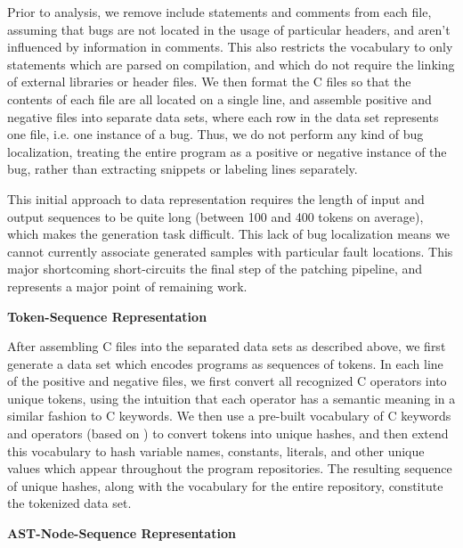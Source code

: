 \documentclass[sigconf]{acmart}
\begin{document}
Prior to analysis, we remove include statements and comments from each file, assuming that bugs are not located in the usage of particular headers, and aren't influenced by information in comments. This also restricts the vocabulary to only statements which are parsed on compilation, and which do not require the linking of external libraries or header files. We then format the C files so that the contents of each file are all located on a single line, and assemble positive and negative files into separate data sets, where each row in the data set represents one file, i.e. one instance of a bug. Thus, we do not perform any kind of bug localization, treating the entire program as a positive or negative instance of the bug, rather than extracting snippets or labeling lines separately. 

This initial approach to data representation requires the length of input and output sequences to be quite long (between 100 and 400 tokens on average), which makes the generation task difficult. This lack of bug localization means we cannot currently associate generated samples with particular fault locations. This major shortcoming short-circuits the final step of the patching pipeline, and represents a major point of remaining work.

\textbf{Token-Sequence Representation}

After assembling C files into the separated data sets as described above, we first generate a data set which encodes programs as sequences of tokens. In each line of the positive and negative files, we first convert all recognized C operators into unique tokens, using the intuition that each operator has a semantic meaning in a similar fashion to C keywords. We then use a pre-built vocabulary of C keywords and operators (based on \cite{cKeywords}) to convert tokens into unique hashes, and then extend this vocabulary to hash variable names, constants, literals, and other unique values which appear throughout the program repositories. The resulting sequence of unique hashes, along with the vocabulary for the entire repository, constitute the tokenized data set. %

\textbf{AST-Node-Sequence Representation}
\end{document}
